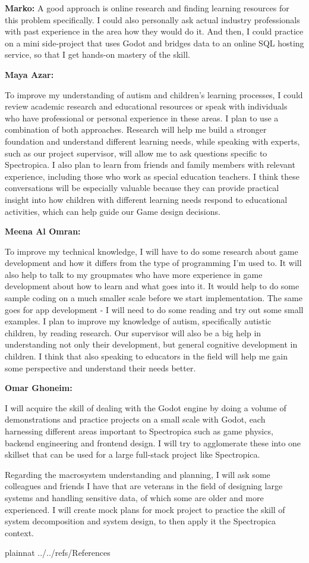 \documentclass[12pt]{article}
\begin{document}
\begin{enumerate}
\textbf{Marko:} A good approach is online research and finding learning
resources for this problem specifically. I could also personally ask actual
industry professionals with past experience in the area how they would do it.
And then, I could practice on a mini side-project that uses Godot and bridges
data to an online SQL hosting service, so that I get hands-on mastery of the
skill.

\textbf{Maya Azar:}

To improve my understanding of autism and children's learning processes, I could
review academic research and educational resources or speak with individuals who
have professional or personal experience in these areas. I plan to use a
combination of both approaches. Research will help me build a stronger
foundation and understand different learning needs, while speaking with experts,
such as our project supervisor, will allow me to ask questions specific to
Spectropica. I also plan to learn from friends and family members with relevant
experience, including those who work as special education teachers. I think
these conversations will be especially valuable because they can provide
practical insight into how children with different learning needs respond to
educational activities, which can help guide our Game design decisions.

\textbf{Meena Al Omran:}

To improve my technical knowledge, I will have to do some research about game development
and how it differs from the type of programming I'm used to. It will also help to talk
to my groupmates who have more experience in game development about how to learn and 
what goes into it. It would help to do some sample coding on a much smaller scale before
we start implementation. The same goes for app development - I will need to do some reading and
try out some small examples.
I plan to improve my knowledge of autism, specifically autistic children, by reading research. Our supervisor
will also be a big help in understanding not only their development, but general cognitive development
in children. I think that also speaking to educators in the field will help me gain some perspective
and understand their needs better.

\textbf{Omar Ghoneim:}

I will acquire the skill of dealing with the Godot engine by doing a volume of demonstrations and practice projects on a small scale with Godot, each harnessing different areas important to Spectropica such as game physics, backend engineering and frontend design. I will try to agglomerate these into one skillset that can be used for a large full-stack project like Spectropica.

Regarding the macrosystem understanding and planning, I will ask some colleagues and friends I have that are veterans in the field of designing large systems and handling sensitive data, of which some are older and more experienced. I will create mock plans for mock project to practice the skill of system decomposition and system design, to then apply it the Spectropica context.

\end{enumerate}

\newpage

 {plainnat}
 {../../refs/References}

\newpage
\end{document}
